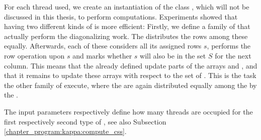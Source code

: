 For each thread used, we create an instantiation of the class , which will not be discussed in this thesis, to perform computations.
Experiments showed that having two different kinds of  is more efficient:
Firstly, we define a family of  that actually perform the diagonalizing work.
The  distributes the rows  among these  equally.
Afterwards, each of these  considers all its assigned rows $s$, 
performs the row operation upon $s$ and marks whether $s$ will also be in the set $S$ for the next column.
This means that the already defined  update parts of the arrays  and ,
and that it remains to update these arrays with respect to the set of .
This is the task the other family of  execute,
where the  are again distributed equally among the  by the .

The input parameters  respectively  define 
how many threads are occupied for the first respectively second type of , see also Subsection \ref{chapter_program:kappa:compute_css}.

